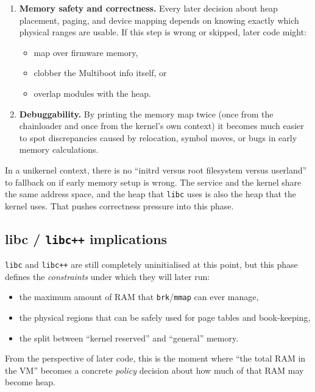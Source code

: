 \documentclass[a4paper,11pt]{article}
\begin{document}
\begin{enumerate}
  \item \textbf{Memory safety and correctness.}  
    Every later decision about heap placement, paging, and device
    mapping depends on knowing exactly which physical ranges are usable.
    If this step is wrong or skipped, later code might:
    \begin{itemize}
      \item map over firmware memory,
      \item clobber the Multiboot info itself, or
      \item overlap modules with the heap.
    \end{itemize}

  \item \textbf{Debuggability.}  
    By printing the memory map twice (once from the chainloader and once
    from the kernel’s own context) it becomes much easier to spot
    discrepancies caused by relocation, symbol moves, or bugs in early
    memory calculations.
\end{enumerate}

In a unikernel context, there is no “initrd versus root filesystem
versus userland” to fallback on if early memory setup is wrong. The
service and the kernel share the same address space, and the heap that
\texttt{libc} uses is also the heap that the kernel uses. That pushes
correctness pressure into this phase.

\subsection{libc / \texorpdfstring{\texttt{libc++}}{libc++} implications}

\texttt{libc} and \texttt{libc++} are still completely uninitialised at this
point, but this phase defines the \emph{constraints} under which they
will later run:

\begin{itemize}
  \item the maximum amount of RAM that \texttt{brk}/\texttt{mmap} can ever
        manage,
  \item the physical regions that can be safely used for page tables and
        book-keeping,
  \item the split between “kernel reserved” and “general” memory.
\end{itemize}

From the perspective of later code, this is the moment where “the total
RAM in the VM” becomes a concrete \emph{policy} decision about how much
of that RAM may become heap.
\end{document}
